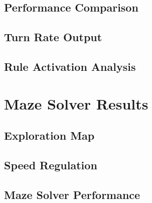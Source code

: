 \subsection{Performance Comparison}

\subsection{Turn Rate Output}

\subsection{Rule Activation Analysis}

\section{Maze Solver Results}

\subsection{Exploration Map}

\subsection{Speed Regulation}

\subsection{Maze Solver Performance}


